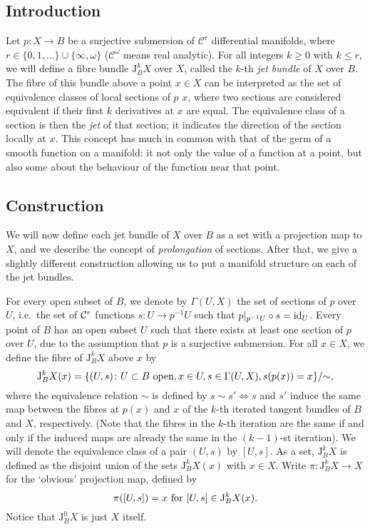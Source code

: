 \documentclass[12pt]{article}
\def\J{\mathrm{J}}
\begin{document}

\subsection{Introduction}
Let $p\colon X\to B$ be a surjective submersion of $\mathcal{C}^r$
differential manifolds, where
$r\in\{0,1,\ldots\}\cup\{\infty,\omega\}$ ($\mathcal{C}^\omega$ means
real analytic).  For all integers $k\ge 0$ with $k\le r$, we will
define a fibre bundle $\J^k_B X$ over $X$, called the $k$-th \emph{jet
bundle} of $X$ over $B$.  The fibre of this bundle above a point $x\in
X$ can be interpreted as the set of equivalence classes of local
sections of $p$  $x$, where two
sections are considered
equivalent if their first $k$ derivatives at $x$ are equal.  The
equivalence class of a section is then the \emph{jet} of that section;
it indicates the direction of the section locally at $x$.  This
concept has much in common with that of the germ of a smooth function
on a manifold: it  not only the value of a
function at a point, but also some 
about the behaviour of the function near that point.

\subsection{Construction}
We will now define each jet bundle of $X$ over $B$ as a set with a
projection map to $X$, and we describe the concept of
\emph{prolongation} of sections.  After that, we give a slightly
different construction allowing us to put a manifold structure on each
of the jet bundles.

For every open subset of $B$, we denote by $\Gamma(U,X)$ the set of
sections of $p$ over $U$, i.e.~the set of ${\cal C}^r$ functions
$s\colon U\to p^{-1}U$ such that $p\vert_{p^{-1}U}\circ s=\mathop{\rm
id}_U$.  Every point of $B$ has an open subset $U$ such that there
exists at least one section of $p$ over $U$, due to the assumption
that $p$ is a surjective submersion.  For all $x\in X$, we define the
fibre of $\J^k_BX$ above $x$ by
$$
\J^k_BX(x)=\{(U,s)\colon U\subset B\hbox{ open},
x\in U,s\in\Gamma(U,X),s(p(x))=x\}/\mathord\sim,
$$
where the equivalence relation $\sim$ is defined by $s\sim
s'\Leftrightarrow s$ and $s'$ induce the same map between the fibres
at $p(x)$ and $x$ of the $k$-th iterated tangent bundles of $B$ and
$X$, respectively.  (Note that the fibres in the $k$-th iteration are
the same if and only if the induced maps are already the same in the
$(k-1)$-st iteration).  We will denote the equivalence class of a pair
$(U,s)$ by $[U,s]$.  As a set, $\J^k_BX$ is defined as the disjoint
union of the sets $\J^k_BX(x)$ with $x\in X$.  Write $\pi\colon
\J^k_BX\to X$ for the `obvious' projection map, defined by
$$
\pi([U,s])=x\hbox{ for }[U,s]\in\J^k_BX(x).
$$
Notice that $\J^0_BX$ is just $X$ itself.
\end{document}

